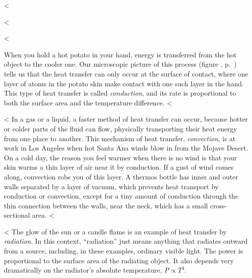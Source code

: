 <%

<%

<%

When you hold a hot potato in your hand, energy is transferred from the hot object to
the cooler one. Our microscopic picture of this process (figure , p.~\pageref{fig:random-motion})
tells us that the heat transfer can only occur at the surface of contact, where one layer of atoms in the
potato skin make contact with one such layer in the hand. This type of heat transfer is called
\emph{conduction},
and its rate is proportional to both the surface area and the temperature difference.
<%

<%
In a gas or a liquid, a faster method of heat transfer can occur, because hotter or colder parts
of the fluid can flow, physically transporting their heat energy from one place to another. This
mechanism of heat transfer, \emph{convection},
is at work in Los Angeles when hot Santa Ana winds blow in from the Mojave Desert. On a cold day,
the reason you feel warmer when there is no wind is that your skin warms a thin layer of air near
it by conduction. If a gust of wind comes along, convection robs you of this layer.
A thermos bottle has inner and outer walls separated by a layer of vacuum, which prevents heat transport
by conduction or convection, except for a tiny amount of conduction through the thin connection between the walls, near the neck, which has
a small cross-sectional area.
<%

<%
The glow of the sun or a candle flame is an example of heat transfer
by \emph{radiation}. In this context, ``radiation'' just means anything that
radiates outward from a source, including, in these examples, ordinary
visible light. The power is proportional to the surface area of the radiating object. It also
depends very dramatically on the radiator's absolute temperature, $P\propto T^4$. 

